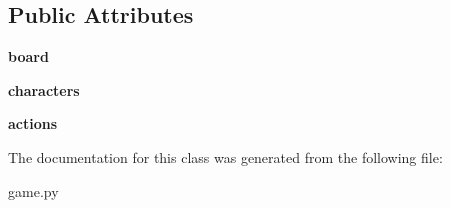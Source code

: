 \subsection*{Public Attributes}
\begin{DoxyCompactItemize}
\item 
\hypertarget{classgame_1_1Player_ae4dd0e9c778731b2e363ec4844c5fbb9}{{\bfseries board}}\label{classgame_1_1Player_ae4dd0e9c778731b2e363ec4844c5fbb9}

\item 
\hypertarget{classgame_1_1Player_aea7a1bfe861faf23a2eb464c5bd8702d}{{\bfseries characters}}\label{classgame_1_1Player_aea7a1bfe861faf23a2eb464c5bd8702d}

\item 
\hypertarget{classgame_1_1Player_a27305ff4a94da59fe209adb7e4917012}{{\bfseries actions}}\label{classgame_1_1Player_a27305ff4a94da59fe209adb7e4917012}

\end{DoxyCompactItemize}


The documentation for this class was generated from the following file\-:\begin{DoxyCompactItemize}
\item 
game.\-py\end{DoxyCompactItemize}
